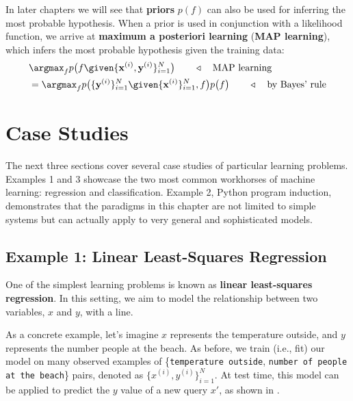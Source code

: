 In later chapters we will see that \textbf{priors} $p(f)$ can also be used for inferring the most probable hypothesis. When a prior is used in conjunction with a likelihood function, we arrive at \textbf{maximum a posteriori learning} (\textbf{MAP learning}), which infers the most probable hypothesis given the training data:
\begin{align}
     & \argmax_f p\big(f \given \{\mathbf{x}^{(i)}, \mathbf{y}^{(i)}\}_{i=1}^N\big) \quad\quad \triangleleft \quad \text{MAP learning}                             \\
     & = \argmax_f p\big(\{\mathbf{y}^{(i)}\}_{i=1}^N \given \{\mathbf{x}^{(i)}\}_{i=1}^N, f\big)p\big(f\big) \quad\quad \triangleleft \quad \text{by Bayes' rule}
\end{align}







\section{Case Studies}
The next three sections cover several case studies of particular learning problems. Examples 1 and 3 showcase the two most common workhorses of machine learning: regression and classification. Example 2, Python program induction, demonstrates that the paradigms in this chapter are not limited to simple systems but can actually apply to very general and sophisticated models.

\subsection{Example 1: Linear Least-Squares Regression}\label{sec:intro_to_learning:least_squares}
One of the simplest learning problems is known as \textbf{linear least-squares regression}. In this setting, we aim to model the relationship between two variables, $x$ and $y$, with a line.

As a concrete example, let's imagine $x$ represents the temperature outside, and $y$ represents the number people at the beach. As before, we train (i.e., fit) our model on many observed examples of \{\texttt{temperature outside}, \texttt{number of people at the beach}\} pairs, denoted as $\{x^{(i)},y^{(i)}\}_{i=1}^N$. At test time, this model can be applied to predict the $y$ value of a new query $x'$, as shown in \fig{\ref{fig:intro_to_learning:ols_train_test}}.

